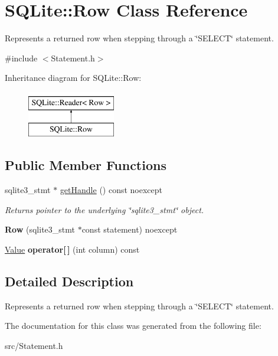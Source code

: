 \hypertarget{class_s_q_lite_1_1_row}{\section{S\-Q\-Lite\-:\-:Row Class Reference}
\label{class_s_q_lite_1_1_row}
}


Represents a returned row when stepping through a \char`\"{}\-S\-E\-L\-E\-C\-T\char`\"{} statement.  




{\ttfamily \#include $<$Statement.\-h$>$}

Inheritance diagram for S\-Q\-Lite\-:\-:Row\-:\begin{figure}[H]
\begin{center}
\leavevmode
\includegraphics[height=2.000000cm]{class_s_q_lite_1_1_row}
\end{center}
\end{figure}
\subsection*{Public Member Functions}
\begin{DoxyCompactItemize}
\item 
\hypertarget{class_s_q_lite_1_1_row_a0cdd34663266ff8c19ee1313a87d51f0}{sqlite3\-\_\-stmt $\ast$ \hyperlink{class_s_q_lite_1_1_row_a0cdd34663266ff8c19ee1313a87d51f0}{get\-Handle} () const noexcept}\label{class_s_q_lite_1_1_row_a0cdd34663266ff8c19ee1313a87d51f0}

\begin{DoxyCompactList}\small\item\em Returns pointer to the underlying \char`\"{}sqlite3\-\_\-stmt\char`\"{} object. \end{DoxyCompactList}\item 
\hypertarget{class_s_q_lite_1_1_row_ac93d6eec191f8f92ce72f481935d1832}{{\bfseries Row} (sqlite3\-\_\-stmt $\ast$const statement) noexcept}\label{class_s_q_lite_1_1_row_ac93d6eec191f8f92ce72f481935d1832}

\item 
\hypertarget{class_s_q_lite_1_1_row_a82ca0ee6352667cc9f6d41972dedd5a6}{\hyperlink{class_s_q_lite_1_1_value}{Value} {\bfseries operator\mbox{[}$\,$\mbox{]}} (int column) const }\label{class_s_q_lite_1_1_row_a82ca0ee6352667cc9f6d41972dedd5a6}

\end{DoxyCompactItemize}


\subsection{Detailed Description}
Represents a returned row when stepping through a \char`\"{}\-S\-E\-L\-E\-C\-T\char`\"{} statement. 



The documentation for this class was generated from the following file\-:\begin{DoxyCompactItemize}
\item 
src/Statement.\-h\end{DoxyCompactItemize}
